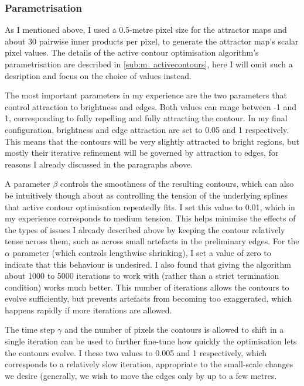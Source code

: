 \subsubsection{Parametrisation}

As I mentioned above, I used a 0.5-metre pixel size for the attractor maps and about 30 pairwise inner products per pixel, to generate the attractor map's scalar pixel values. The details of the active contour optimisation algorithm's parametrisation are described in \ref{sub:m_activecontours}, here I will omit such a desription and focus on the choice of values instead.

The most important parameters in my experience are the two parameters that control attraction to brightness and edges. Both values can range between -1 and 1, corresponding to fully repelling and fully attracting the contour. In my final configuration, brightness and edge attraction are set to 0.05 and 1 respectively. This means that the contours will be very slightly attracted to bright regions, but mostly their iterative refinement will be governed by attraction to edges, for reasons I already discussed in the paragraphs above.

A parameter $\beta$ controls the smoothness of the resulting contours, which can also be intuitively though about as controlling the tension of the underlying splines that active contour optimisation repeatedly fits. I set this value to 0.01, which in my experience corresponds to medium tension. This helps minimise the effects of the types of issues I already described above by keeping the contour relatively tense across them, such as across small artefacts in the preliminary edges. 
For the $\alpha$ parameter (which controls lengthwise shrinking), I set a value of zero to indicate that this behaviour is undesired. I also found that giving the algorithm about 1000 to 5000 iterations to work with (rather than a strict termination condition) works much better. This number of iterations allows the contours to evolve sufficiently, but prevents artefacts from becoming too exaggerated, which happens rapidly if more iterations are allowed.

The time step $\gamma$ and the number of pixels the contours is allowed to shift in a single iteration can be used to further fine-tune how quickly the optimisation lets the contours evolve. I these two values to 0.005 and 1 respectively, which corresponds to a relatively slow iteration, appropriate to the small-scale changes we desire (generally, we wish to move the edges only by up to a few metres.

